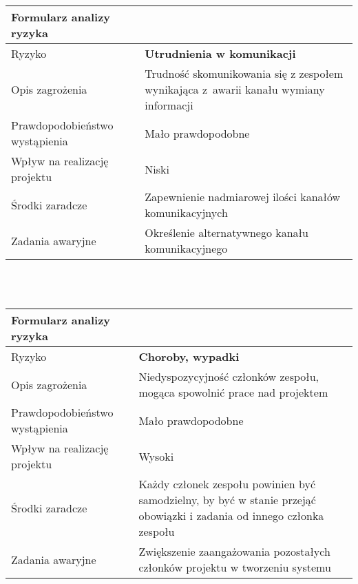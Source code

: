 \documentclass{article}
\begin{document}
{\def\arraystretch{1.3}\tabcolsep=10pt
\begin{tabular}{|L{6cm}|L{9cm}|}
\hline
Formularz analizy ryzyka &  \\
\hline
Ryzyko 						   & \textbf{Utrudnienia w komunikacji} \\
\hline
Opis zagrożenia				   & Trudność skomunikowania się z zespołem wynikająca z~awarii kanału wymiany informacji \\
\hline
Prawdopodobieństwo wystąpienia & Mało prawdopodobne \\
\hline
Wpływ na realizację projektu   & Niski \\
\hline
Środki zaradcze				   & Zapewnienie nadmiarowej ilości kanałów komunikacyjnych \\
\hline
Zadania awaryjne			   & Określenie alternatywnego kanału komunikacyjnego \\
\hline
\end{tabular}}

\mbox{}\\\mbox{}\\

{\def\arraystretch{1.3}\tabcolsep=10pt
\begin{tabular}{|L{6cm}|L{9cm}|}
\hline
Formularz analizy ryzyka &  \\
\hline
Ryzyko 						   & \textbf{Choroby, wypadki} \\
\hline
Opis zagrożenia				   & Niedyspozycyjność członków zespołu, mogąca spowolnić prace nad projektem \\
\hline
Prawdopodobieństwo wystąpienia & Mało prawdopodobne \\
\hline
Wpływ na realizację projektu   & Wysoki \\
\hline
Środki zaradcze				   & Każdy członek zespołu powinien być samodzielny, by być w stanie przejąć obowiązki i zadania od innego członka zespołu \\
\hline
Zadania awaryjne			   & Zwiększenie zaangażowania pozostałych członków projektu w tworzeniu systemu \\
\hline
\end{tabular}}

\mbox{}\\\mbox{}\\
\end{document}
